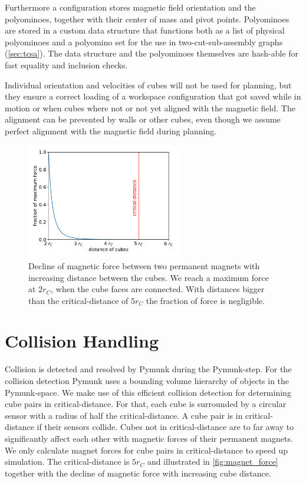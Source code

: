 Furthermore a configuration stores magnetic field orientation and the polyominoes, together with their center of mass and pivot points.
Polyominoes are stored in a custom data structure that functions both as a list of physical polyominoes and a polyomino set for the use in two-cut-sub-assembly graphs (\autoref{sec:tcsa}).
The data structure and the polyominoes themselves are hash-able for fast equality and inclusion checks.

Individual orientation and velocities of cubes will not be used for planning, but they ensure a correct loading of a workspace configuration that got saved while in motion or when cubes where not or not yet aligned with the magnetic field.
The alignment can be prevented by walls or other cubes, even though we assume perfect alignment with the magnetic field during planning.

\begin{figure}
	\centering
	\includegraphics[width=0.6\textwidth]{figures/plots/magnet_force.pdf}
	\caption[Declining magnetic forces with increasing cube distance.]{Decline of magnetic force between two permanent magnets with increasing distance between the cubes. We reach a maximum force at $2 r_C$, when the cube faces are connected. With distances bigger than the critical-distance of $5 r_C$ the fraction of force is negligible.}
	\label{fig:magnet_force}
\end{figure}

\section{Collision Handling}
\label{sec:coll_handling}

Collision is detected and resolved by Pymunk during the Pymunk-step.
For the collision detection Pymunk uses a bounding volume hierarchy of objects in the Pymunk-space.
We make use of this efficient collision detection for determining cube pairs in critical-distance.
For that, each cube is surrounded by a circular sensor with a radius of half the critical-distance.
A cube pair is in critical-distance if their sensors collide.
Cubes not in critical-distance are to far away to significantly affect each other with magnetic forces of their permanent magnets.
We only calculate magnet forces for cube pairs in critical-distance to speed up simulation.
The critical-distance is $5 r_C$ and illustrated in \autoref{fig:magnet_force} together with the decline of magnetic force with increasing cube distance.

